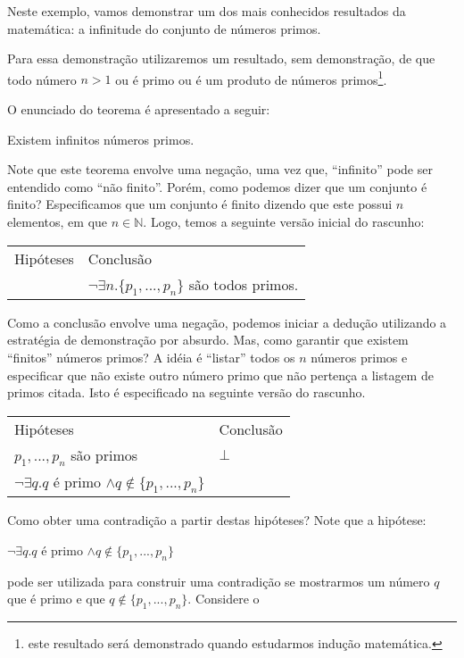 \begin{Example}
Neste exemplo, vamos demonstrar um dos mais conhecidos resultados da
matemática: a infinitude do conjunto de números primos.

Para essa demonstração utilizaremos um resultado, sem demonstração, de
que todo número $n >1$ ou é primo ou é um produto de números primos\footnote{este resultado será demonstrado quando estudarmos indução matemática.}.

O enunciado do teorema é apresentado a seguir:

\begin{flushleft}
Existem infinitos números primos.
\end{flushleft}
Note que este teorema envolve uma negação, uma vez que, ``infinito''
pode ser entendido como ``não finito''.
Porém, como podemos dizer que um conjunto é finito? Especificamos que um
conjunto é finito dizendo que este possui $n$ elementos, em que
$n\in\mathbb{N}$. Logo, temos a seguinte versão inicial do rascunho:
\begin{flushleft}
\begin{tabular}{ll}
Hipóteses & Conclusão \\
 & $\neg\exists n. \{p_1,...,p_n\}$ são todos primos.
\end{tabular}
\end{flushleft}
Como a conclusão envolve uma negação, podemos iniciar a dedução
utilizando a estratégia de demonstração por absurdo. Mas, como
garantir que existem ``finitos'' números primos? A idéia é ``listar''
todos os $n$ números primos e especificar que não existe outro número
primo que não pertença a listagem de primos citada. Isto é
especificado na seguinte versão do rascunho.
\begin{flushleft}
\begin{tabular}{ll}
Hipóteses & Conclusão \\
$p_1,...,p_n$ são primos & $\bot$ \\
$\neg \exists q. q$ é primo $\land q\not\in\{p_1,...,p_n\}$ &\\
\end{tabular}
\end{flushleft}
Como obter uma contradição a partir destas hipóteses? Note que a
hipótese:
\begin{flushleft}
$\neg \exists q. q$ é primo $\land q\not\in\{p_1,...,p_n\}$
\end{flushleft}
pode ser utilizada para construir uma contradição se mostrarmos um
número $q$ que é primo e que $q\not\in\{p_1,...,p_n\}$. Considere o

\end{Example}
